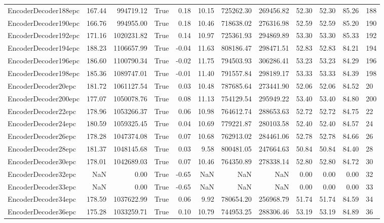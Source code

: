 \begin{tabular}{lrrlrrrrrrrl}
EncoderDecoder188epc & 167.44 & 994719.12 & True & 0.18 & 10.15 & 725262.30 & 269456.82 & 52.30 & 52.30 & 85.26 & 188 \\
EncoderDecoder190epc & 166.76 & 994955.00 & True & 0.18 & 10.46 & 718638.02 & 276316.98 & 52.59 & 52.59 & 85.20 & 190 \\
EncoderDecoder192epc & 171.16 & 1020231.82 & True & 0.14 & 10.97 & 725361.93 & 294869.89 & 53.30 & 53.30 & 85.33 & 192 \\
EncoderDecoder194epc & 188.23 & 1106657.99 & True & -0.04 & 11.63 & 808186.47 & 298471.51 & 52.83 & 52.83 & 84.21 & 194 \\
EncoderDecoder196epc & 186.60 & 1100790.34 & True & -0.02 & 11.75 & 794503.93 & 306286.41 & 53.23 & 53.23 & 84.29 & 196 \\
EncoderDecoder198epc & 185.36 & 1089747.01 & True & -0.01 & 11.40 & 791557.84 & 298189.17 & 53.33 & 53.33 & 84.39 & 198 \\
EncoderDecoder20epc & 181.72 & 1061127.54 & True & 0.03 & 10.48 & 787685.64 & 273441.90 & 52.06 & 52.06 & 84.52 & 20 \\
EncoderDecoder200epc & 177.07 & 1050078.76 & True & 0.08 & 11.13 & 754129.54 & 295949.22 & 53.40 & 53.40 & 84.80 & 200 \\
EncoderDecoder22epc & 178.96 & 1053266.37 & True & 0.06 & 10.98 & 764612.74 & 288653.63 & 52.72 & 52.72 & 84.75 & 22 \\
EncoderDecoder24epc & 180.59 & 1059325.45 & True & 0.04 & 10.69 & 779221.87 & 280103.58 & 52.40 & 52.40 & 84.57 & 24 \\
EncoderDecoder26epc & 178.28 & 1047374.08 & True & 0.07 & 10.68 & 762913.02 & 284461.06 & 52.78 & 52.78 & 84.66 & 26 \\
EncoderDecoder28epc & 181.37 & 1048145.68 & True & 0.03 & 9.58 & 800481.05 & 247664.63 & 50.84 & 50.84 & 84.40 & 28 \\
EncoderDecoder30epc & 178.01 & 1042689.03 & True & 0.07 & 10.46 & 764350.89 & 278338.14 & 52.80 & 52.80 & 84.72 & 30 \\
EncoderDecoder32epc & NaN & 0.00 & True & -0.65 & NaN & NaN & NaN & 0.00 & 0.00 & 0.00 & 32 \\
EncoderDecoder33epc & NaN & 0.00 & True & -0.65 & NaN & NaN & NaN & 0.00 & 0.00 & 0.00 & 33 \\
EncoderDecoder34epc & 178.59 & 1037622.99 & True & 0.06 & 9.92 & 780654.20 & 256968.79 & 51.74 & 51.74 & 84.59 & 34 \\
EncoderDecoder36epc & 175.28 & 1033259.71 & True & 0.10 & 10.79 & 744953.25 & 288306.46 & 53.19 & 53.19 & 84.89 & 36 \\

\end{tabular}
